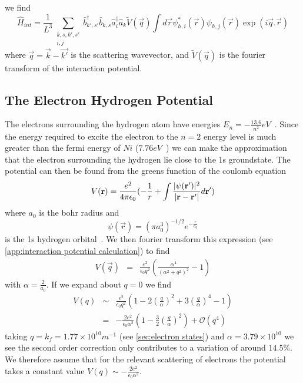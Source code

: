 we find
\begin{equation}
    \hat{H}_{int} = \frac{1}{L^3}
    \sum_{\substack{ k,s,k',s'\\ i,j}}
    \hat{b}^\dagger_{k',s'}\hat{b}_{k,s}
    \hat{a}^\dagger_i \hat{a}_k
    \tilde{V}(\vec{q})\int{d\vec{r}
        \psi^*_{h,i}(\vec{r})\psi_{h,j}(\vec{r})
        \exp(i\vec{q}.\vec{r})}\label{eqn:interaction hamiltonian expanded}
\end{equation}
where \(\vec{q} = \vec{k} - \vec{k'}\)
is the scattering wavevector, and
\(\tilde{V}(\vec{q})\) is the
fourier transform of the interaction
potential.


\subsection{The Electron Hydrogen Potential}\label{sec:electron hydrogen potential}

The electrons surrounding the hydrogen
atom have energies
\(E_n = -\frac{13.6}{n^2} eV\)~\cite{griffiths_schroeter_2018}.
Since the energy required to excite the electron
to the \(n=2\) energy level is much greater
than the fermi energy of \(Ni\)
(\(7.76eV\)~\cite{PhysRev.131.2469}) we can
make the approximation that the electron surrounding
the hydrogen lie close to the 1s groundstate.
The potential can then be found from
the greens function of the coulomb
equation~\cite{AQP_Problems}
\begin{equation}
    V(\mathbf{r}) = \frac{e^2}{4 \pi \epsilon_0}(
    -\frac{1}{r}
    + \int{\frac{\lvert\psi(\mathbf{r}')\rvert^2}{
            \lvert\mathbf{r} - \mathbf{r'}\rvert} d\mathbf{r}'})
\end{equation}
where \(a_0\) is
the bohr radius and
\begin{equation}
    \psi(\vec{r}) = {(\pi a_0^3)}^{-1/2} e^{-\frac{r}{a_0}}
\end{equation}
is the 1s hydrogen orbital~\cite{griffiths_schroeter_2018}.
We then fourier
transform this expression
(see \cref{app:interaction potential calculation})
to find
\begin{eqnarray}
    V(\vec{q}) &=& \frac{e^2}{\epsilon_0 q^2}(
    \frac{\alpha^4}{{(\alpha^2 + q^2)}^2} - 1
    )
\end{eqnarray}
with \(\alpha = \frac{2}{a_0}\). If we expand
about \(q=0\) we find
\begin{eqnarray}
    V(q) &\sim&\frac{e^2}{\epsilon_0 q^2}(1 - 2{(\frac{q}{\alpha})}^2 + 3 {(\frac{q}{\alpha})}^4 - 1)\\
    {} &=& -\frac{2e^2}{\epsilon_0 \alpha^2}(1 - \frac{3}{2}{(\frac{q}{\alpha})}^2) + \mathcal{O}(q^4)
\end{eqnarray}
taking \(q = k_f = 1.77\times{}10^{10}m^{-1}\)
(see \cref{sec:electron states})
and \(\alpha = 3.79\times{}10^{10}\) we see the second
order correction only contributes to a variation
of around \(14.5\% \).
We therefore assume that for the relevant scattering
of electrons the potential takes a constant
value \(V(q) \sim -\frac{2e^2}{\epsilon_0 \alpha^2}\).

